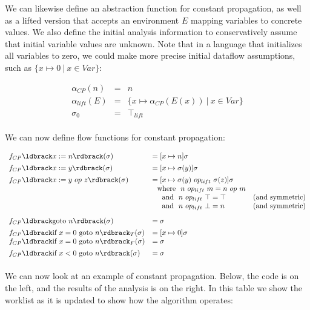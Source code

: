 \documentclass[11pt]{article}
\newcommand{\parg}[1] %
  {\ldbrack #1 \rdbrack}
\begin{document}
We can likewise define an abstraction function for constant propagation, as well as a lifted version that accepts an environment $E$ mapping variables to concrete values.  We also define the initial analysis information to conservatively assume that initial variable values are unknown.  Note that in a language that initializes all variables to zero, we could make more precise initial dataflow assumptions, such as $\{ x \mapsto 0 ~|~ x \in \textit{Var} \}$:

\[
\begin{array}{ccl}

\alpha_{CP}(n) & = & n\\
\alpha_{lift}(E) & = & \{ x \mapsto \alpha_{CP}(E(x)) ~|~ x \in \textit{Var} \}\\
\sigma_0 & = & \top_{lift} \\

\end{array}
\]

We can now define flow functions for constant propagation:

\[
\begin{array}{lll}

f_{CP}\parg{x := n}(\sigma) & = [x \mapsto n]\sigma\\[1ex]

f_{CP}\parg{x := y}(\sigma) & = [x \mapsto \sigma(y)]\sigma\\[1ex]

f_{CP}\parg{x := y ~op~ z}(\sigma) & = [x \mapsto \sigma(y) ~op_{lift}~ \sigma(z)]\sigma\\
 & ~~\mbox{where}~~ n ~op_{lift}~ m = n ~op~ m\\
 & ~~~~\mbox{and}~~ n ~op_{lift}~ \top = \top & \mbox{(and symmetric)}\\
 & ~~~~\mbox{and}~~ n ~op_{lift}~ \bottom = n & \mbox{(and symmetric)}\\[2ex]
f_{CP}\parg{\mbox{goto}~n}(\sigma) & = \sigma\\[1ex]

f_{CP}\parg{\mbox{if}~x=0~\mbox{goto}~n}_T(\sigma) & = [x \mapsto 0]\sigma\\
f_{CP}\parg{\mbox{if}~x=0~\mbox{goto}~n}_F(\sigma) & = \sigma\\[1ex]
f_{CP}\parg{\mbox{if}~x<0~\mbox{goto}~n}(\sigma) & = \sigma\\[1ex]

\end{array}
\]

We can now look at an example of constant propagation.  Below, the code is on the left, and the results of the analysis is on the right. In this table we show the worklist as it is updated to show how the algorithm operates:  
\end{document}
